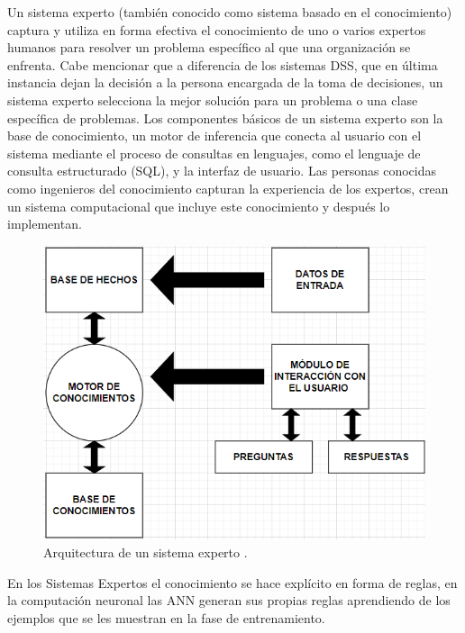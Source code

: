 Un sistema experto (también conocido como sistema basado en el conocimiento) captura y utiliza en forma efectiva el conocimiento de uno o varios expertos humanos para resolver un problema específico al que una organización se enfrenta. Cabe mencionar que a diferencia de los sistemas DSS, que en última instancia dejan la decisión a la persona encargada de la toma de decisiones, un sistema experto selecciona la mejor solución para un problema o una clase específica de problemas. Los componentes básicos de un sistema experto son la base de conocimiento, un motor de inferencia que conecta al usuario con el sistema mediante el proceso de consultas en lenguajes, como el lenguaje de consulta estructurado (SQL), y la interfaz de usuario. Las personas conocidas como ingenieros del conocimiento capturan la experiencia de los expertos, crean un sistema computacional que incluye este conocimiento y después lo implementan\cite{kendall2005analisis}.



\begin{figure}[H]
  \begin{center}
    \includegraphics[scale=0.50]{./hechos.png}
    \caption{Arquitectura de un sistema experto \cite{diez2001introduccion}.}
    \label{fig:Arquitectura de un sistema experto}
  \end{center}
\end{figure}




En los Sistemas Expertos el conocimiento se hace explícito en forma de reglas, en la computación neuronal las ANN generan sus propias reglas aprendiendo de los ejemplos que se les muestran en la fase de entrenamiento\cite{olabe1998redes}. 



